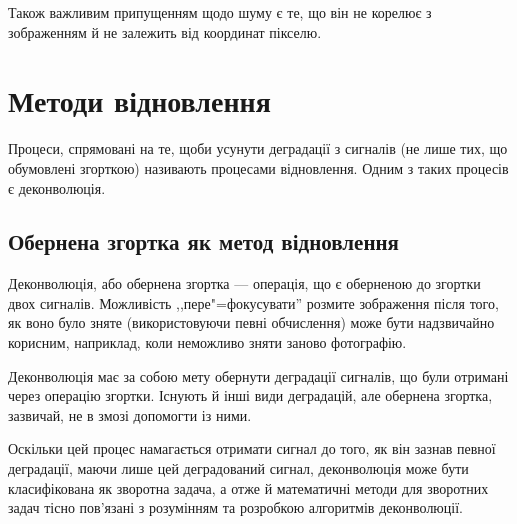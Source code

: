 \documentclass{diploma}
\begin{document}
      Також важливим припущенням щодо шуму є те, що він не корелює з
      зображенням й не залежить від координат пікселю.
      \clearpage
  \section{Методи відновлення}
    Процеси, спрямовані на те, щоби усунути деградації з сигналів (не лише
    тих, що обумовлені згорткою) називають процесами відновлення.
    Одним з таких процесів є деконволюція.

    \subsection{Обернена згортка як метод відновлення}
      Деконволюція, або обернена згортка --- операція, що є оберненою до
      згортки двох сигналів.
      Можливість ,,пере"=фокусувати'' розмите зображення після того, як воно
      було зняте (використовуючи певні обчислення) може бути надзвичайно
      корисним, наприклад, коли неможливо зняти заново фотографію.

      Деконволюція має за собою мету обернути деградації сигналів, що були
      отримані через операцію згортки.
      Існують й інші види деградацій, але обернена згортка, зазвичай, не в
      змозі допомогти із ними.

      Оскільки цей процес намагається отримати сигнал до того, як він зазнав
      певної деградації, маючи лише цей деградований сигнал, деконволюція може
      бути класифікована як зворотна задача, а отже й математичні методи для
      зворотних задач тісно пов’язані з розумінням та розробкою алгоритмів
      деконволюції.
\end{document}
